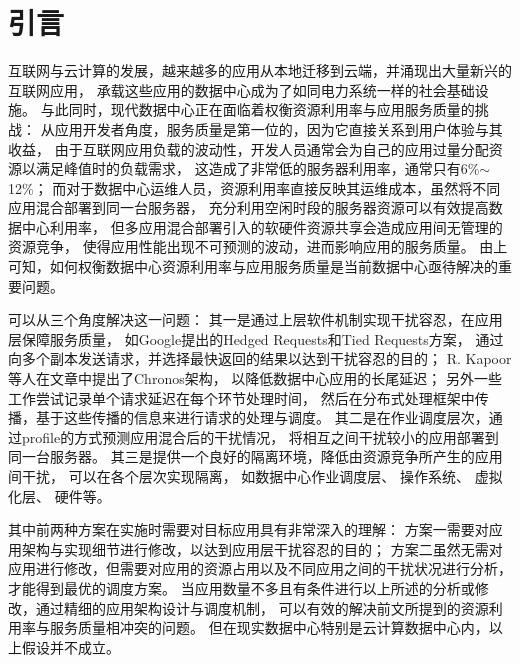 

\chapter{引言}
\label{chap:intro}

互联网与云计算的发展，越来越多的应用从本地迁移到云端，并涌现出大量新兴的互联网应用，
承载这些应用的数据中心成为了如同电力系统一样的社会基础设施。
与此同时，现代数据中心正在面临着权衡资源利用率与应用服务质量的挑战：
从应用开发者角度，服务质量是第一位的，因为它直接关系到用户体验与其收益，
由于互联网应用负载的波动性，开发人员通常会为自己的应用过量分配资源以满足峰值时的负载需求，
这造成了非常低的服务器利用率，通常只有6\%$\sim$12\%；
而对于数据中心运维人员，资源利用率直接反映其运维成本，虽然将不同应用混合部署到同一台服务器，
充分利用空闲时段的服务器资源可以有效提高数据中心利用率，
但多应用混合部署引入的软硬件资源共享会造成应用间无管理的资源竞争，
使得应用性能出现不可预测的波动，进而影响应用的服务质量。
由上可知，如何权衡数据中心资源利用率与应用服务质量是当前数据中心亟待解决的重要问题。

可以从三个角度解决这一问题：
其一是通过上层软件机制实现干扰容忍，在应用层保障服务质量，
如Google提出的Hedged Requests和Tied Requests方案\cite{dean_tail_2013}，
通过向多个副本发送请求，并选择最快返回的结果以达到干扰容忍的目的；
R. Kapoor等人在文章\cite{Kapoor:2012:Chronos}中提出了Chronos架构，
以降低数据中心应用的长尾延迟；
另外一些工作\cite{timecard:2013, d2p:2014}尝试记录单个请求延迟在每个环节处理时间，
然后在分布式处理框架中传播，基于这些传播的信息来进行请求的处理与调度。
其二是在作业调度层次，通过profile的方式预测应用混合后的干扰情况，
将相互之间干扰较小的应用部署到同一台服务器\cite{mars_bubble-up:_2011, kambadur_measuring_2012}。
其三是提供一个良好的隔离环境，降低由资源竞争所产生的应用间干扰，
可以在各个层次实现隔离，
如数据中心作业调度层\cite{Hindman:2011:Mesos, Schwarzkopf_omega_2013, borg:2015}、
操作系统\cite{cgroup, lin_gaining_2008, tam_managing_2007, liu_software_2012, Liu:2014:ISCA}、
虚拟化层\cite{Xu:2013:Bobtail:, Xu:2013:SMALL}、
硬件\cite{kasture_ubik:_2014, sanchez_vantage:_2011, sanchez_zcache:_2010, qureshi_utility-based_2006, muralidhara_reducing_2011}等。


其中前两种方案在实施时需要对目标应用具有非常深入的理解：
方案一需要对应用架构与实现细节进行修改，以达到应用层干扰容忍的目的；
方案二虽然无需对应用进行修改，但需要对应用的资源占用以及不同应用之间的干扰状况进行分析，
才能得到最优的调度方案。
当应用数量不多且有条件进行以上所述的分析或修改，通过精细的应用架构设计与调度机制，
可以有效的解决前文所提到的资源利用率与服务质量相冲突的问题。
但在现实数据中心特别是云计算数据中心内，以上假设并不成立。

